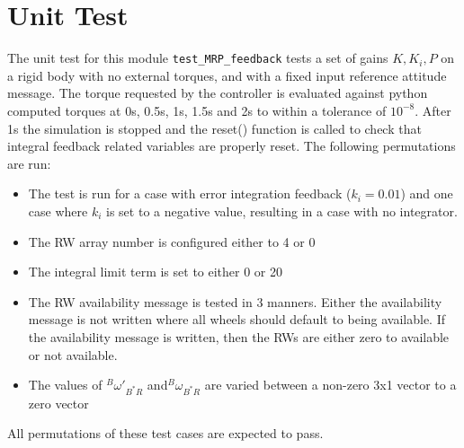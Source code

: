 \documentclass[]{BasiliskReportMemo}
\begin{document}
\section{Unit Test}
The unit test for this module \verb|test_MRP_feedback| tests a set of gains $K,K_i,P$ on a rigid body with no external torques, and with a fixed input reference attitude message. The torque requested by the controller is evaluated against python computed torques at 0s, 0.5s, 1s, 1.5s and 2s to within a tolerance of $10^{-8}$. After 1s the simulation is stopped and the reset() function is called to check that integral feedback related variables are properly reset.  The following permutations are run:
\begin{itemize}
	\item The test is run for a case with error integration feedback ($k_i=0.01$) and one case where $k_i$ is set to a negative value, resulting in a case with no integrator. 
	\item The RW array number is configured either to 4 or 0
	\item The integral limit term is set to either 0 or 20
	\item The RW availability message is tested in 3 manners.  Either the availability  message is not written where all wheels should default to being available.  If the availability message is written, then the RWs are either zero to available or not available.
	\item The values of $^B\omega'_{B^*R}$ and$^B\omega_{B^*R}$ are varied between a non-zero 3x1 vector to a zero vector
\end{itemize}
All permutations of these test cases are expected to pass.
\end{document}
